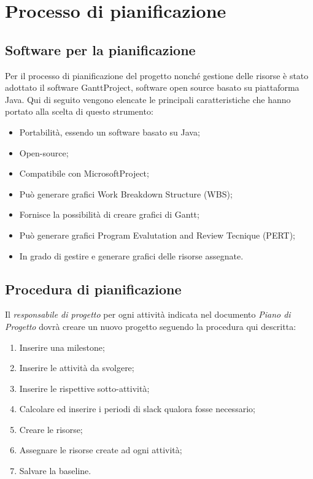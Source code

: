\section{Processo di pianificazione}
\subsection{Software per la pianificazione}
Per il processo di pianificazione del progetto nonché gestione delle risorse è stato adottato il software GanttProject, software open source basato su piattaforma Java. Qui di seguito vengono elencate le principali caratteristiche che hanno portato alla scelta di questo strumento:
\begin{itemize}
\item Portabilità, essendo un software basato su Java;
\item Open-source;
\item Compatibile con MicrosoftProject;
\item Può generare grafici Work Breakdown Structure (WBS);
\item Fornisce la possibilità di creare grafici di Gantt;
\item Può generare grafici Program Evalutation and Review Tecnique (PERT);
\item In grado di gestire e generare grafici delle risorse assegnate.
\end{itemize}

\subsection{Procedura di pianificazione}
Il \textit{responsabile di progetto} per ogni attività indicata nel documento \textit{Piano di Progetto} dovrà creare un nuovo progetto seguendo la procedura qui descritta:

\begin{enumerate}
\item Inserire una milestone;
\item Inserire le attività da svolgere;
\item Inserire le rispettive sotto-attività;
\item Calcolare ed inserire i periodi di slack qualora fosse necessario;
\item Creare le risorse;
\item Assegnare le risorse create ad ogni attività;
\item Salvare la baseline.
\end{enumerate}

